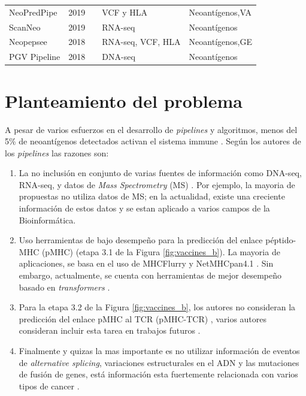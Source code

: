 \documentclass[a4paper,11pt]{article}
\begin{document}
\begin{table}[h]
{{\begin{tabular}{lllp{4.5cm}p{2.7cm}}
	NeoPredPipe     & 2019 &\cite{schenck2019neopredpipe}     & VCF y HLA                            & Neoantígenos,VA              \\
	
	ScanNeo         & 2019 &\cite{wang2019scanneo}            & RNA-seq                                                  & Neoantígenos                                       \\
	
		
	Neopepsee       & 2018 &\cite{kim2018neopepsee}           & RNA-seq, VCF, HLA  & Neoantígenos,GE    \\ 
	
	PGV Pipeline    & 2018 &\cite{rubinsteyn2018computational}& DNA-seq                                                  & Neoantígenos                                       \\
	

\end{tabular}
}	
}
\end{table}




\section{Planteamiento del problema}

A pesar de varios esfuerzos en el desarrollo de \textit{pipelines} y algoritmos, menos del 5\% de neoantígenos detectados activan el sistema immune \citep{de2020neoantigen, mill2022neoms, bulik2019deep, bassani2015mass, yadav2014predicting}. Según los autores de los \textit{pipelines} las razones son: 

\begin{enumerate}
	\item La no inclusión en conjunto de varias fuentes de información como DNA-seq, RNA-seq, y datos de \textit{Mass Spectrometry} (MS) \citep{kim2018neopepsee}. Por ejemplo, la mayoria de  propuestas no utiliza datos de MS; en la actualidad, existe una creciente información de estos datos y se estan aplicado a varios campos de la Bioinformática.
	\item  Uso herramientas de bajo desempeño para la predicción del enlace péptido-MHC (pMHC) (etapa 3.1  de la Figura \ref{fig:vaccines_b}). La mayoria de aplicaciones, se basa en el uso de MHCFlurry \citep{o2020mhcflurry} y NetMHCpan4.1 \citep{reynisson2020netmhcpan}. Sin embargo, actualmente, se cuenta con herramientas de mejor desempeño basado en \textit{transformers} \citep{arceda2023neoantigen}.
	\item Para la etapa 3.2 de la Figura \ref{fig:vaccines_b}, los autores no consideran  la predicción del enlace pMHC al TCR (pMHC-TCR) , varios autores consideran incluir esta tarea en trabajos futuros  \citep{rubinsteyn2018computational}.
	\item Finalmente y quizas la mas importante es no utilizar información de eventos de \textit{alternative splicing}, variaciones estructurales en el ADN y las mutaciones de fusión de genes, está información esta fuertemente relacionada con varios tipos de cancer \citep{wood2020neoepiscope}.
\end{enumerate}
\end{document}
